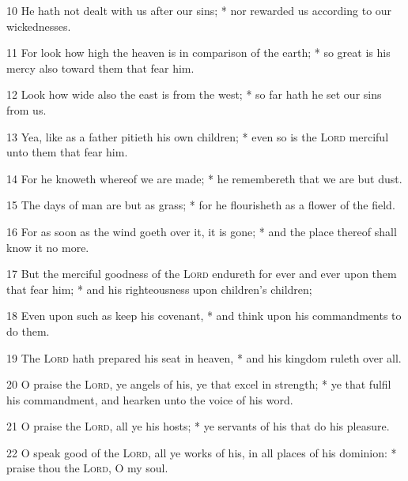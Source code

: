 10 He hath not dealt with us after our sins; * nor rewarded us according to our wickednesses.\par
11 For look how high the heaven is in comparison of the earth; * so great is his mercy also toward them that fear him.\par
12 Look how wide also the east is from the west; * so far hath he set our sins from us.\par
13 Yea, like as a father pitieth his own children; * even so is the {\textsc{Lord}} merciful unto them that fear him.\par
14 For he knoweth whereof we are made; * he remembereth that we are but dust.\par
15 The days of man are but as grass; * for he flourisheth as a flower of the field.\par
16 For as soon as the wind goeth over it, it is gone; * and the place thereof shall know it no more.\par
17 But the merciful goodness of the {\textsc{Lord}} endureth for ever and ever upon them that fear him; * and his righteousness upon children's children;\par
18 Even upon such as keep his covenant, * and think upon his commandments to do them.\par
19 The {\textsc{Lord}} hath prepared his seat in heaven, * and his kingdom ruleth over all.\par
20 O praise the {\textsc{Lord}}, ye angels of his, ye that excel in strength; * ye that fulfil his commandment, and hearken unto the voice of his word.\par
21 O praise the {\textsc{Lord}}, all ye his hosts; * ye servants of his that do his pleasure.\par
22 O speak good of the {\textsc{Lord}}, all ye works of his, in all places of his dominion: * praise thou the {\textsc{Lord}}, O my soul.
